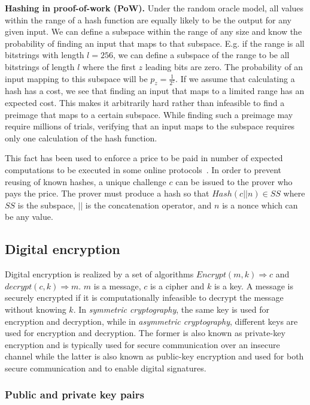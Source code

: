 \noindent
{\bf Hashing in proof-of-work (PoW).}
Under the random oracle model, all values within the range of a hash function are equally likely to be the output for any given input. We can define a subspace within the range of any size and know the probability of finding an input that maps to that subspace. E.g. if the range is all bitstrings with length $l=256$, we can define a subspace of the range to be all bitstrings of length $l$ where the first $z$ leading bits are zero. The probability of an input mapping to this subspace will be $p_z=\frac{1}{2^z}$. If we assume that calculating a hash has a cost, we see that finding an input that maps to a limited range has an expected cost. This makes it arbitrarily hard rather than infeasible to find a preimage that maps to a certain subspace. While finding such a preimage may require millions of trials, verifying that an input maps to the subspace requires only one calculation of the hash function.  

This fact has been used to enforce a price to be paid in number of expected computations to be executed in some online protocols~\cite{dwork_pricing_1993,back_hashcash-denial_2002}. In order to prevent reusing of known hashes, a unique challenge $c$ can be issued to the prover who pays the price. The prover must produce a hash so that $Hash(c || n) \in SS$ where $SS$ is the subspace, $||$ is the concatenation operator, and $n$ is a nonce which can be any value. 


\subsection{Digital encryption}

Digital encryption is realized by a set of algorithms $Encrypt(m, k) \Rightarrow c$ and $decrypt(c, k) \Rightarrow m$. $m$ is a message, $c$ is a cipher and $k$ is a key. A message is securely encrypted if it is computationally infeasible to decrypt the message without knowing $k$. In \emph{symmetric cryptography}, the same key is used for encryption and decryption, while in \emph{asymmetric cryptography}, different keys are used for encryption and decryption. The former is also known as private-key encryption and is typically used for secure communication over an insecure channel while the latter is also known as public-key encryption and used for both secure communication and to enable digital signatures.

\subsubsection{Public and private key pairs}

